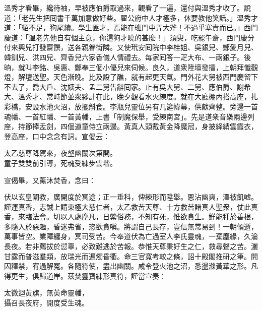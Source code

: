 溫秀才看畢，纔待袖，早被應伯爵取過來，觀看了一遍，還付與溫秀才收了。說道：「老先生把囘書千萬加意做好些。翟公府中人才極多，休要教他笑話。」溫秀才道：「貂不足，狗尾續。學生匪才，焉能在班門中弄大斧！不過乎塞責而已。」西門慶道：「溫老先他自有個主意，你這狗才曉的甚麼！」須臾，吃罷午齋，西門慶分付來興兒打發齋饌，送各親眷街隣。又使玳安囘院中李桂姐、吳銀兒、鄭愛月兒、韓釧兒、洪四兒、齊香兒六家香儀人情禮去。每家囘答一疋大布、一兩銀子。後晌，就叫李銘、吳惠、鄭奉三個小優兒來伺候。良久，道衆陞壇發擂，上朝拜懺觀燈，解壇送聖。天色漸晚。比及設了醮，就有起更天氣。門外花大舅被西門慶留下不去了，喬大戶、沈姨夫、孟二舅告辭囘家。止有吳大舅、二舅、應伯爵、謝希大、溫秀才、常峙節並衆夥計在此，晚夕觀看水火練度。就在大廳棚內搭高座，扎彩橋，安設水池火沼，放擺斛食。李瓶兒靈位另有几筵幃幕，供獻齊整。旁邊一首魂幡、一首紅幡、一首黃幡，上書「制魔保舉，受練南宮」。先是道衆音樂兩邊列座，持節捧盂劍，四個道童侍立兩邊。黃真人頭戴黃金降魔冠，身披絳綃雲霞衣，登高座，口中念念有詞。宣偈云：

\begin{myquote} 
太乙慈尊降駕來，夜壑幽關次第開。\\童子雙雙前引導，死魂受練步雲堦。
\end{myquote} 

宣偈畢，又薰沐焚香，念曰：

\begin{myquote}[\markfont]
伏以玄皇闡教，廣開度於冥途；正一垂科，俾練形而陞舉。恩沾幽爽，澤被飢嘘。謹運真香，志誠上請東極大慈仁者，太乙救苦天尊、十方救苦諸真人聖衆，仗此真香，來臨法會。切以人處塵凡，日縈俗務，不知有死，惟欲貪生。鮮能種於善根，多隨入於惡趣，昏迷弗省，恣欲貪嗔。將謂自己長存，豈信無常易到！一朝傾逝，萬事皆空。業障纏身，冥司受苦。今奉道伏為亡過室人李氏靈魂，一棄塵緣，久淪長夜。若非薦拔於愆辜，必致難逃於苦報。恭惟天尊秉好生之仁，救尋聲之苦。灑甘露而普滋羣類，放瑞光而遍燭昏衢。命三官寬考較之條，詔十殿閣推研之筆。開囚釋禁，宥過解冤。各隨符使，盡出幽關。咸令登火池之沼，悉盪滌黃華之形。凡得更生，俱歸道岸。茲焚靈寶練形真符，謹當宣奏：

太微迴黃旗，無英命靈幡，\\攝召長夜府，開度受生魂。

\end{myquote} 

